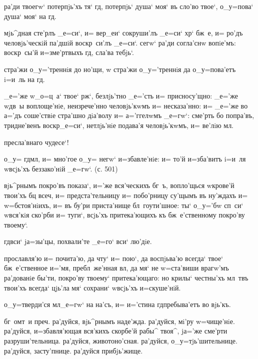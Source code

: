   ра'ди твоегw` потерпjь'хъ тя` 
гд, потерпjь` душа` моя` въ сло'во твое`, о_у=пова` 
душа` моя` на гд.

 мjь^дная сте'рлъ _е=си`, и= вер_еи` 
сокруши'лъ _е=си` хр` бж~е, и= ро'дъ человjь'ческiй 
па'дшiй воскр~си'лъ _е=си`. сегw` ра'ди согла'снw 
вопiе'мъ: воскр~сы'й и=з\ъ ме'ртвыхъ гд, сла'ва 
тебjь`.

 стра'жи о_у='треннiя до но'щи, w\т 
стра'жи о_у='треннiя да о_у=пова'етъ i=и~ль на гд.

 _е='же w\т _о=ц~а` твое` рж`, 
безлjь'тно _е='сть и= присносу'щно: _е='же w\т дв~ы 
воплоще'нiе, неизрече'нно человjь'кwмъ и= несказа'нно: и= 
_е='же во а='дъ соше'ствiе стра'шно дiа'волу и= 
а='ггелwмъ _е=гw`: сме'рть бо попра'въ, тридне'венъ 
воскр _е=си`, нетлjь'нiе подава'я человjь'кwмъ, и= 
ве'лiю мл.


 пресла'внаго чудесе`!

  о_у= гд мл, и= мно'гое о_у= 
негw` и=збавле'нiе: и= то'й и=зба'витъ i=и~ля w\т всjь'хъ 
беззако'нiй _е=гw`. (с. 501)

 вjь^рнымъ покро'въ показа`, и='же 
вся'ческихъ бг~ъ, вопло'щься w\т крове'й твои'хъ бц 
всеч, и= предста'тельницу и= побо'рницу су'щымъ въ 
ну'ждахъ и= w=бстоя'нiихъ, и= въ бу'ри приста'нище 
бл~гоути'шное: ты` о_у='бw сп~си` w\т вся'кiя ско'рби и= 
туги`, всjь'хъ притека'ющихъ къ бж~е'ственному покро'ву 
твоему`.

  гд вси` jа=зы'цы, похвали'те 
_е=го` вси` лю'дiе.

 прославля'ю и= почита'ю, да чту` и= пою`, да 
воспjьва'ю всегда` твое` бж~е'ственное и='мя, 
пребл~же'нная вл, да мя` не w=ста'виши врагw'мъ 
ра'дованiе бы'ти, покро'ву твоему` притека'ющаго: но 
крилы` честны'хъ мл~твъ твои'хъ всегда` цjь'ла мя` 
сохрани` w\т всjь'хъ и=скуше'нiй.

  о_у=тверди'ся мл _е=гw` на 
на'съ, и= и='стина гд пребыва'етъ во вjь'къ.

 бг~омт~и преч. ра'дуйся, вjь^рнымъ 
наде'жда. ра'дуйся, мi'ру w=чище'нiе. ра'дуйся, 
и=збавля'ющая вся'кихъ скорбе'й рабы^ твоя^, jа='же 
сме'рти разруши'тельница. ра'дуйся, животоно'сная. 
ра'дуйся, о_у=тjь'шительнице. ра'дуйся, засту'пнице. 
ра'дуйся прибjь'жище.

